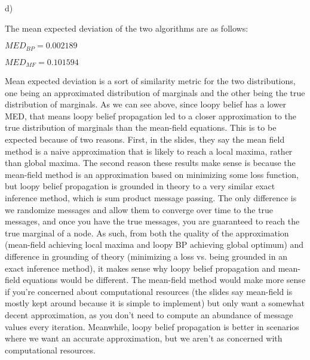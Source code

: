 d)

The mean expected deviation of the two algorithms are as follows:

$MED_{BP} = 0.002189$

$MED_{MF} = 0.101594$

Mean expected deviation is a sort of similarity metric for the two distributions, one being an approximated distribution of marginals and the other being the true distribution of marginals. As we can see above, since loopy belief has a lower MED, that means loopy belief propagation led to a closer approximation to the true distribution of marginals than the mean-field equations. This is to be expected because of two reasons. First, in the slides, they say the mean field method is a naive approximation that is likely to reach a local maxima, rather than global maxima. The second reason these results make sense is because the mean-field method is an approximation based on minimizing some loss function, but loopy belief propagation is grounded in theory to a very similar exact inference method, which is sum product message passing. The only difference is we randomize messages and allow them to converge over time to the true messages, and once you have the true messages, you are guaranteed to reach the true marginal of a node. As such, from both the quality of the approximation (mean-field achieving local maxima and loopy BP achieving global optimum) and difference in grounding of theory (minimizing a loss vs. being grounded in an exact inference method), it makes sense why loopy belief propagation and mean-field equations would be different. The mean-field method would make more sense if you're concerned about computational resources (the slides say mean-field is mostly kept around because it is simple to implement) but only want a somewhat decent approximation, as you don't need to compute an abundance of message values every iteration. Meanwhile, loopy belief propagation is better in scenarios where we want an accurate approximation, but we aren't as concerned with computational resources.
